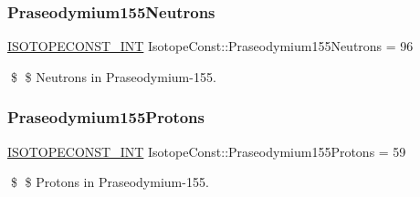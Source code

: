 \subsubsection{\texorpdfstring{Praseodymium155\+Neutrons}{Praseodymium155Neutrons}}
{\footnotesize\ttfamily \mbox{\hyperlink{group___isotope_const-_macros_ga5f18360b3e99483a35c32d789e62621c}{I\+S\+O\+T\+O\+P\+E\+C\+O\+N\+S\+T\+\_\+\+I\+NT}} Isotope\+Const\+::\+Praseodymium155\+Neutrons = 96}

\$ \$ Neutrons in Praseodymium-\/155. \mbox{\label{group___isotope_const-_praseodymium-_pr155_ga644765707ef8c2c44767db49ddaf1a92}} 
\subsubsection{\texorpdfstring{Praseodymium155\+Protons}{Praseodymium155Protons}}
{\footnotesize\ttfamily \mbox{\hyperlink{group___isotope_const-_macros_ga5f18360b3e99483a35c32d789e62621c}{I\+S\+O\+T\+O\+P\+E\+C\+O\+N\+S\+T\+\_\+\+I\+NT}} Isotope\+Const\+::\+Praseodymium155\+Protons = 59}

\$ \$ Protons in Praseodymium-\/155. 